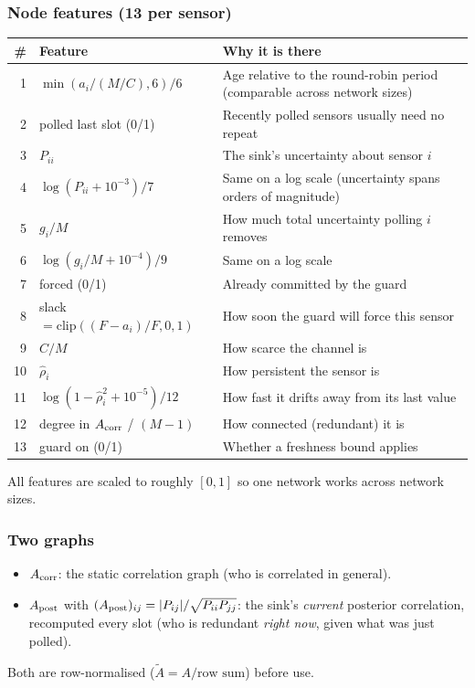 \subsubsection{Node features (13 per sensor)}
\begin{center}
\small
\begin{tabularx}{\textwidth}{@{}rlX@{}}
\toprule
\# & Feature & Why it is there \\
\midrule
1 & $\min(a_i/(M/C),6)/6$ & Age relative to the round-robin period (comparable across network sizes) \\
2 & polled last slot (0/1) & Recently polled sensors usually need no repeat \\
3 & $P_{ii}$ & The sink's uncertainty about sensor $i$ \\
4 & $\log(P_{ii}+10^{-3})/7$ & Same on a log scale (uncertainty spans orders of magnitude) \\
5 & $g_i/M$ & How much total uncertainty polling $i$ removes \\
6 & $\log(g_i/M+10^{-4})/9$ & Same on a log scale \\
7 & forced (0/1) & Already committed by the guard \\
8 & slack $=\mathrm{clip}((F-a_i)/F,0,1)$ & How soon the guard will force this sensor \\
9 & $C/M$ & How scarce the channel is \\
10 & $\hat\rho_i$ & How persistent the sensor is \\
11 & $\log(1-\hat\rho_i^2+10^{-5})/12$ & How fast it drifts away from its last value \\
12 & degree in $A_{\mathrm{corr}}$ / $(M-1)$ & How connected (redundant) it is \\
13 & guard on (0/1) & Whether a freshness bound applies \\
\bottomrule
\end{tabularx}
\end{center}
All features are scaled to roughly $[0,1]$ so one network works across network sizes.

\subsubsection{Two graphs}
\begin{itemize}
  \item $A_{\mathrm{corr}}$: the static correlation graph (who is correlated in general).
  \item $A_{\mathrm{post}}$ with $(A_{\mathrm{post}})_{ij}=|P_{ij}|/\sqrt{P_{ii}P_{jj}}$: the sink's \emph{current} posterior correlation,
        recomputed every slot (who is redundant \emph{right now}, given what was just polled).
\end{itemize}
Both are row-normalised ($\tilde A = A/\text{row sum}$) before use.

